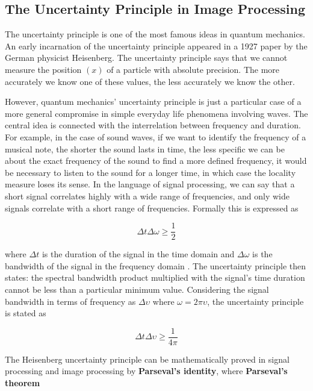 \subsection{The Uncertainty Principle in Image Processing}\label{ch:uncertainty_principle}

The uncertainty principle is one of the most famous ideas in quantum mechanics. An early incarnation of the uncertainty principle appeared in a 1927 paper by the German physicist Heisenberg. The uncertainty principle says that we cannot measure the position $(x)$ of a particle with absolute precision. The more accurately we know one of these values, the less accurately we know the other.

However, quantum mechanics' uncertainty principle is just a particular case of a more general compromise in simple everyday life phenomena involving waves. The central idea is connected with the interrelation between frequency and duration. For example, in the case of sound waves, if we want to identify the frequency of a musical note, the shorter the sound lasts in time, the less specific we can be about the exact frequency of the sound to find a more defined frequency, it would be necessary to listen to the sound for a longer time, in which case the locality measure loses its sense. In the language of signal processing, we can say that a short signal correlates highly with a wide range of frequencies, and only wide signals correlate with a short range of frequencies. Formally this is expressed as

\begin{equation}\label{eq:uncertainty_principle_rad}
	\Delta t\Delta \omega \geq \frac{1}{2}
\end{equation}

where $\Delta t$ is the duration of the signal in the time domain and $\Delta \omega$ is the bandwidth of the signal in the frequency domain \citep{Petrou.Sevilla:Book:2006}. The uncertainty principle then states: the spectral bandwidth product multiplied with the signal's time duration cannot be less than a particular minimum value. Considering the signal bandwidth in terms of frequency as $\Delta \upsilon$ where $\omega = 2\pi \upsilon$, the uncertainty principle is stated as 

\begin{equation}\label{eq:uncertainty_principle_freq}
	\Delta t\Delta \upsilon \geq \frac{1}{4\pi}
\end{equation}

The Heisenberg uncertainty principle can be mathematically proved in signal processing and image processing by \textbf{Parseval's identity}, where \textbf{Parseval's theorem}

